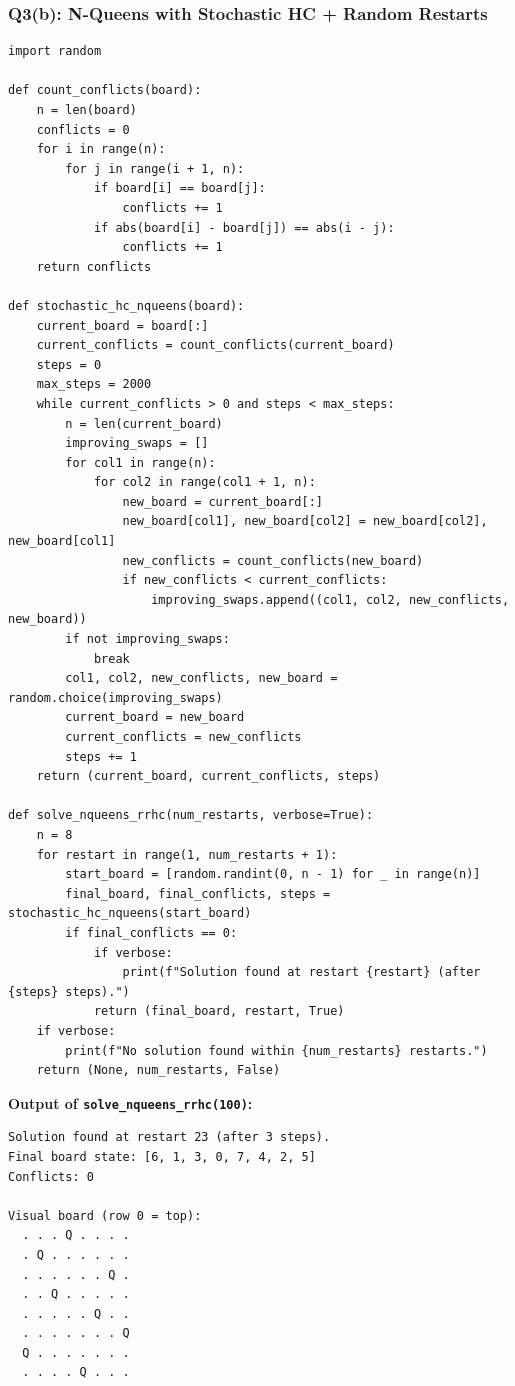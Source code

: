\documentclass[12pt,a4paper]{article}
\begin{document}
\subsubsection*{Q3(b): N-Queens with Stochastic HC + Random Restarts}

\begin{lstlisting}[style=pycode, caption={Q3(b): N-Queens}]
import random

def count_conflicts(board):
    n = len(board)
    conflicts = 0
    for i in range(n):
        for j in range(i + 1, n):
            if board[i] == board[j]:
                conflicts += 1
            if abs(board[i] - board[j]) == abs(i - j):
                conflicts += 1
    return conflicts

def stochastic_hc_nqueens(board):
    current_board = board[:]
    current_conflicts = count_conflicts(current_board)
    steps = 0
    max_steps = 2000
    while current_conflicts > 0 and steps < max_steps:
        n = len(current_board)
        improving_swaps = []
        for col1 in range(n):
            for col2 in range(col1 + 1, n):
                new_board = current_board[:]
                new_board[col1], new_board[col2] = new_board[col2], new_board[col1]
                new_conflicts = count_conflicts(new_board)
                if new_conflicts < current_conflicts:
                    improving_swaps.append((col1, col2, new_conflicts, new_board))
        if not improving_swaps:
            break
        col1, col2, new_conflicts, new_board = random.choice(improving_swaps)
        current_board = new_board
        current_conflicts = new_conflicts
        steps += 1
    return (current_board, current_conflicts, steps)

def solve_nqueens_rrhc(num_restarts, verbose=True):
    n = 8
    for restart in range(1, num_restarts + 1):
        start_board = [random.randint(0, n - 1) for _ in range(n)]
        final_board, final_conflicts, steps = stochastic_hc_nqueens(start_board)
        if final_conflicts == 0:
            if verbose:
                print(f"Solution found at restart {restart} (after {steps} steps).")
            return (final_board, restart, True)
    if verbose:
        print(f"No solution found within {num_restarts} restarts.")
    return (None, num_restarts, False)
\end{lstlisting}

\textbf{Output of \texttt{solve\_nqueens\_rrhc(100)}:}

\begin{lstlisting}[style=output]
Solution found at restart 23 (after 3 steps).
Final board state: [6, 1, 3, 0, 7, 4, 2, 5]
Conflicts: 0

Visual board (row 0 = top):
  . . . Q . . . .
  . Q . . . . . .
  . . . . . . Q .
  . . Q . . . . .
  . . . . . Q . .
  . . . . . . . Q
  Q . . . . . . .
  . . . . Q . . .
\end{lstlisting}
\end{document}
